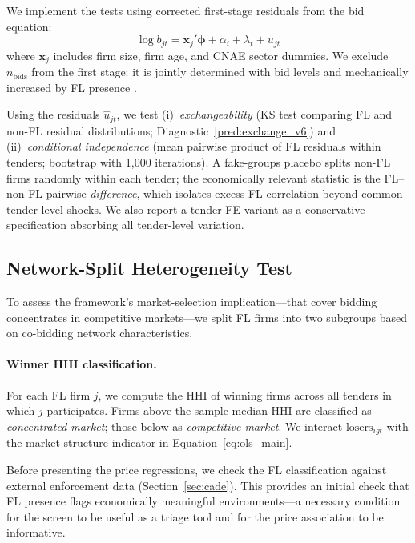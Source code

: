 We implement the \citet{bajari2003deciding} tests using corrected
first-stage residuals from the bid equation:
\begin{equation}
  \log b_{jt} = \mathbf{x}_j'\boldsymbol{\phi} + \alpha_i + \lambda_t
  + u_{jt}
  \label{eq:by_first_stage}
\end{equation}
where $\mathbf{x}_j$ includes firm size, firm age, and CNAE sector
dummies. We exclude $n_{\text{bids}}$ from the first stage: it is
jointly determined with bid levels and mechanically increased by FL
presence \citep[p.~978]{bajari2003deciding}.

Using the residuals $\hat{u}_{jt}$, we test (i)~\emph{exchangeability}
(KS test comparing FL and non-FL residual distributions;
Diagnostic~\ref{pred:exchange_v6}) and (ii)~\emph{conditional
independence} (mean pairwise product of FL residuals within tenders;
bootstrap with 1,000 iterations). A fake-groups placebo splits non-FL
firms randomly within each tender; the economically relevant statistic
is the FL--non-FL pairwise \emph{difference}, which isolates excess
FL correlation beyond common tender-level shocks. We also report a
tender-FE variant as a conservative specification absorbing all
tender-level variation.


\subsection{Network-Split Heterogeneity Test}
\label{sec:empirical_network}

To assess the framework's market-selection implication---that cover
bidding concentrates in competitive markets---we split FL firms into two
subgroups based on co-bidding network characteristics.

\paragraph{Winner HHI classification.}
For each FL firm $j$, we compute the HHI of winning firms across all
tenders in which $j$ participates. Firms above the sample-median HHI
are classified as \emph{concentrated-market}; those below as
\emph{competitive-market}. We interact $\text{losers}_{igt}$ with the
market-structure indicator in Equation~\eqref{eq:ols_main}.

Before presenting the price regressions, we check the FL
classification against external enforcement data
(Section~\ref{sec:cade}). This provides an initial check that FL
presence flags economically meaningful environments---a necessary
condition for the screen to be useful as a triage tool and for the
price association to be informative.
